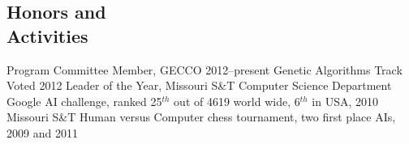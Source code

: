 \documentclass[margin,line]{resume}
\begin{document}
\begin{resume}
    \section{\mysidestyle Honors and\\Activities} 
    Program Committee Member, GECCO 2012--present Genetic Algorithms Track \vspace{1mm}\\%
    Voted 2012 Leader of the Year, Missouri S\&T Computer Science Department \vspace{1mm}\\%
    Google AI challenge, ranked 25$^{th}$ out of 4619 world wide, 6$^{th}$ in USA, 2010 \vspace{1mm}\\%
    Missouri S\&T Human versus Computer chess tournament, two first place AIs, 2009 and 2011 \vspace{1mm}\\%
\begin{comment}    
    ACM SIG-Game Competition testing and balancing using evolving AI, 2009--present \vspace{1mm}\\%
    ACM SIG-Game first place AI, 2008          \vspace{1mm}\\%
    University of Illinois at Urbana-Champaign MechMania AI competition second place AI, 2007  \vspace{1mm}\\%
    Missouri S\&T Alumni Scholarship 2006--2010             %

    \section{\mysidestyle Programming} 
    Python, C, C++, C\#, Matlab, Linux shell scripting, \LaTeX, Java, CUDA.


\end{comment}
\end{resume}
\end{document}

